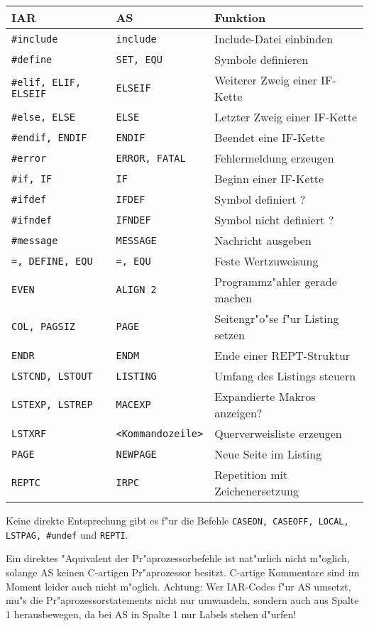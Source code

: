 \documentclass[12pt,a4paper,twoside]{report}
\newcommand{\tty}[1]{{\tt #1}}
\begin{document}
{\begin{table*}[htb]
\begin{center}\begin{tabular}{|l|l|l|}
\hline
IAR & AS & Funktion\\
\hline
\hline
\tty{\#include} & \tty{include} & Include-Datei einbinden \\
\tty{\#define} & \tty{SET, EQU} & Symbole definieren \\
\tty{\#elif, ELIF, ELSEIF} & \tty{ELSEIF} & Weiterer Zweig einer IF-Kette \\
\tty{\#else, ELSE} & \tty{ELSE} & Letzter Zweig einer IF-Kette \\ 
\tty{\#endif, ENDIF} & \tty{ENDIF} & Beendet eine IF-Kette \\
\tty{\#error} & \tty{ERROR, FATAL} & Fehlermeldung erzeugen \\
\tty{\#if, IF} & \tty{IF} & Beginn einer IF-Kette\\
\tty{\#ifdef} & \tty{IFDEF} & Symbol definiert ? \\
\tty{\#ifndef} & \tty{IFNDEF} & Symbol nicht definiert ? \\
\tty{\#message} & \tty{MESSAGE} & Nachricht ausgeben \\
\tty{=, DEFINE, EQU} & \tty{=, EQU} & Feste Wertzuweisung \\
\tty{EVEN} & \tty{ALIGN 2} & Programmz"ahler gerade machen \\
\tty{COL, PAGSIZ} & \tty{PAGE} & Seitengr"o"se f"ur Listing setzen \\
\tty{ENDR} & \tty{ENDM} & Ende einer REPT-Struktur \\
\tty{LSTCND, LSTOUT} & \tty{LISTING} & Umfang des Listings steuern \\
\tty{LSTEXP, LSTREP} & \tty{MACEXP} & Expandierte Makros anzeigen? \\
\tty{LSTXRF} & \verb!<Kommandozeile>! & Querverweisliste erzeugen \\
\tty{PAGE} & \tty{NEWPAGE} & Neue Seite im Listing \\
\tty{REPTC} & \tty{IRPC} & Repetition mit Zeichenersetzung \\
\hline
\end{tabular}\end{center}
\end{table*}

Keine direkte Entsprechung gibt es f"ur die Befehle {\tt CASEON, CASEOFF,
LOCAL, LSTPAG, \#undef} und {\tt REPTI}.

Ein direktes "Aquivalent der Pr"aprozessorbefehle ist nat"urlich nicht
m"oglich, solange AS keinen C-artigen Pr"aprozessor besitzt.  C-artige
Kommentare sind im Moment leider auch nicht m"oglich.  Achtung: Wer
IAR-Codes f"ur AS umsetzt, mu"s die Pr"aprozessorstatements nicht nur
umwandeln, sondern auch aus Spalte 1 herausbewegen, da bei AS in Spalte 1
nur Labels stehen d"urfen!


}
\end{document}
